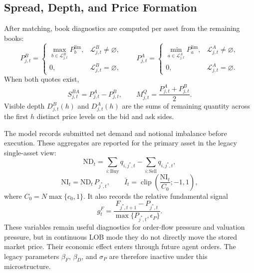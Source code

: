 \documentclass[12pt, a4paper]{article}
\DeclareMathOperator{\clip}{clip}
\begin{document}
    \subsection{Spread, Depth, and Price Formation}

    After matching, book diagnostics are computed per asset from the remaining
    books:
    \[
        P_{j,t}^B=
        \begin{cases}
            \max_{b\in\mathcal{L}_{j,t}^B} P_b^{\text{lim}}, & \mathcal{L}_{j,t}^B\ne\varnothing,\\
            0, & \mathcal{L}_{j,t}^B=\varnothing,
        \end{cases}
        \qquad
        P_{j,t}^A=
        \begin{cases}
            \min_{a\in\mathcal{L}_{j,t}^A} P_a^{\text{lim}}, & \mathcal{L}_{j,t}^A\ne\varnothing,\\
            0, & \mathcal{L}_{j,t}^A=\varnothing.
        \end{cases}
    \]
    When both quotes exist,
    \[
        S_{j,t}^{BA}=P_{j,t}^A-P_{j,t}^B,
        \qquad
        M_{j,t}^Q=\frac{P_{j,t}^A+P_{j,t}^B}{2}.
    \]
    Visible depth \(D_{j,t}^B(h)\) and \(D_{j,t}^A(h)\) are the sums of remaining
    quantity across the first \(h\) distinct price levels on the bid and ask sides.

    The model records submitted net demand and notional imbalance before execution.
    These aggregates are reported for the primary asset in the legacy single-asset
    view:
    \[
        \mathrm{ND}_t=
        \sum_{i:\mathrm{Buy}} q_{i,j^{\ast},t}
        -
        \sum_{i:\mathrm{Sell}} q_{i,j^{\ast},t},
    \]
    \[
        \mathrm{NI}_t=\mathrm{ND}_t\,P_{j^{\ast},t},
        \qquad
        \bar I_t=\clip\!\left(\frac{\mathrm{NI}_t}{C_0};-1,1\right),
    \]
    where \(C_0=N\max\{c_0,1\}\). It also records the relative fundamental signal
    \[
        g_t^{F}=\frac{F_{j^{\ast},t+1}-P_{j^{\ast},t}}{\max\{P_{j^{\ast},t},\epsilon_P\}}.
    \]
    These variables remain useful diagnostics for order-flow pressure and
    valuation pressure, but in continuous LOB mode they do not directly move the
    stored market price. Their economic effect enters through future agent orders.
    The legacy parameters \(\beta_F\), \(\beta_D\), and \(\sigma_P\) are therefore
    inactive under this microstructure.
\end{document}
